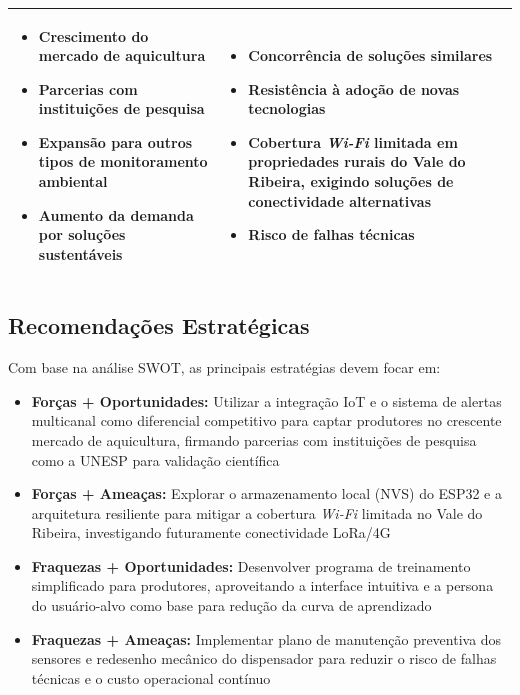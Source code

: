 \documentclass[11pt,a4paper]{article}
\begin{document}
\begin{table}[H]
\begin{tabular}{|p{7.2cm}|p{7.2cm}|}
\begin{minipage}[t]{7cm}
\begin{itemize}
    \item Crescimento do mercado de aquicultura
    \item Parcerias com instituições de pesquisa
    \item Expansão para outros tipos de monitoramento ambiental
    \item Aumento da demanda por soluções sustentáveis
\end{itemize}
\end{minipage}
&
\begin{minipage}[t]{7cm}
\begin{itemize}
    \item Concorrência de soluções similares
    \item Resistência à adoção de novas tecnologias
    \item Cobertura \textit{Wi-Fi} limitada em propriedades rurais do Vale do Ribeira, exigindo soluções de conectividade alternativas
    \item Risco de falhas técnicas
\end{itemize}
\end{minipage}
\\
\hline
\end{tabular}
\end{table}

\subsection{Recomendações Estratégicas}

Com base na análise SWOT, as principais estratégias devem focar em:
\begin{itemize}
    \item \textbf{Forças + Oportunidades:} Utilizar a integração IoT e o sistema de alertas multicanal como diferencial competitivo para captar produtores no crescente mercado de aquicultura, firmando parcerias com instituições de pesquisa como a UNESP para validação científica
    \item \textbf{Forças + Ameaças:} Explorar o armazenamento local (NVS) do ESP32 e a arquitetura resiliente para mitigar a cobertura \textit{Wi-Fi} limitada no Vale do Ribeira, investigando futuramente conectividade LoRa/4G
    \item \textbf{Fraquezas + Oportunidades:} Desenvolver programa de treinamento simplificado para produtores, aproveitando a interface intuitiva e a persona do usuário-alvo como base para redução da curva de aprendizado
    \item \textbf{Fraquezas + Ameaças:} Implementar plano de manutenção preventiva dos sensores e redesenho mecânico do dispensador para reduzir o risco de falhas técnicas e o custo operacional contínuo
\end{itemize}
\end{document}
